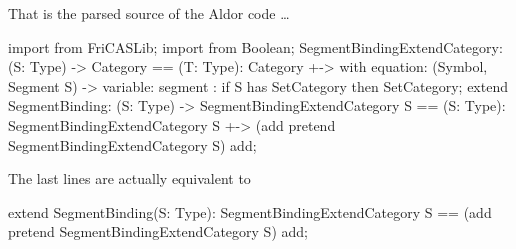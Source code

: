 \documentclass{article}
\begin{document}
That is the parsed source of the Aldor code \ldots
\begin{code}
import from FriCASLib;
import from Boolean;
SegmentBindingExtendCategory: (S: Type) -> Category ==
  (T: Type): Category +-> with {
  equation: (Symbol, Segment S) -> %
  variable: %
  segment : %
  if S has SetCategory then SetCategory;
}
extend SegmentBinding: (S: Type) -> SegmentBindingExtendCategory S ==
  (S: Type): SegmentBindingExtendCategory S +->
    (add pretend SegmentBindingExtendCategory S) add;
\end{code}
The last lines are actually equivalent to
\begin{code}
extend SegmentBinding(S: Type): SegmentBindingExtendCategory S ==
    (add pretend SegmentBindingExtendCategory S) add;
\end{code}
\end{document}
